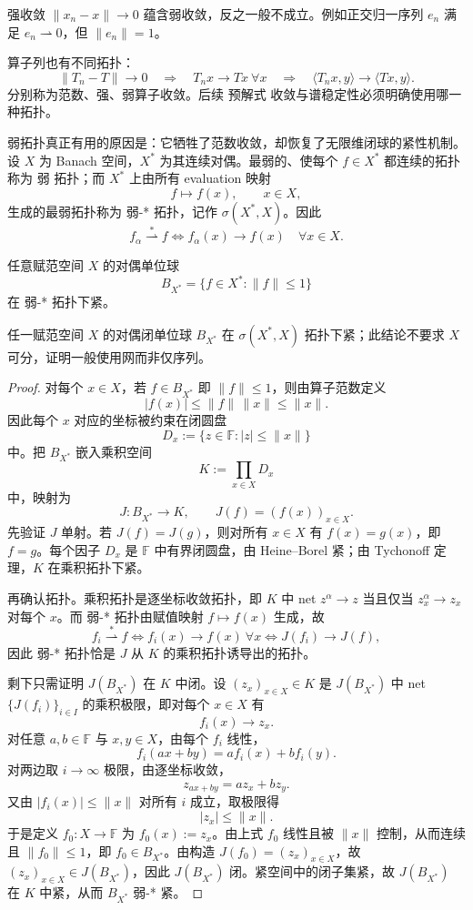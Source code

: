 强收敛 $\|x_n-x\|\to0$ 蕴含弱收敛，反之一般不成立。例如正交归一序列 $e_n$ 满足 $e_n\rightharpoonup0$，但 $\|e_n\|=1$。

算子列也有不同拓扑：
\[
\|T_n-T\|\to0
\quad\Longrightarrow\quad
T_nx\to Tx\ \forall x
\quad\Longrightarrow\quad
\langle T_nx,y\rangle\to\langle Tx,y\rangle.
\]
分别称为范数、强、弱算子收敛。后续 预解式 收敛与谱稳定性必须明确使用哪一种拓扑。

弱拓扑真正有用的原因是：它牺牲了范数收敛，却恢复了无限维闭球的紧性机制。设 $X$ 为 Banach 空间，$X^*$ 为其连续对偶。最弱的、使每个 $f\in X^*$ 都连续的拓扑称为 弱 拓扑；而 $X^*$ 上由所有 evaluation 映射
\[
f\longmapsto f(x),
\qquad x\in X,
\]
生成的最弱拓扑称为 弱-* 拓扑，记作 $\sigma(X^*,X)$。因此
\[
f_\alpha\overset{*}{\rightharpoonup}f
\iff
f_\alpha(x)\to f(x)
\quad\forall x\in X.
\]

\begin{theorem}
任意赋范空间 $X$ 的对偶单位球
\[
B_{X^*}=\{f\in X^*:\|f\|\le1\}
\]
在 弱-* 拓扑下紧。
\end{theorem}

\begin{theorem}[对偶单位球的弱星紧性]
任一赋范空间 $X$ 的对偶闭单位球 $B_{X^*}$ 在 $\sigma(X^*,X)$ 拓扑下紧；此结论不要求 $X$ 可分，证明一般使用网而非仅序列。
\end{theorem}
\begin{proof}
对每个 $x\in X$，若 $f\in B_{X^*}$ 即 $\|f\|\le1$，则由算子范数定义
\[
|f(x)|\le\|f\|\,\|x\|\le\|x\|.
\]
因此每个 $x$ 对应的坐标被约束在闭圆盘
\[
D_x:=\{z\in\mathbb F:|z|\le\|x\|\}
\]
中。把 $B_{X^*}$ 嵌入乘积空间
\[
K:=\prod_{x\in X}D_x
\]
中，映射为
\[
J:B_{X^*}\to K,
\qquad
J(f)=(f(x))_{x\in X}.
\]
先验证 $J$ 单射。若 $J(f)=J(g)$，则对所有 $x\in X$ 有 $f(x)=g(x)$，即 $f=g$。每个因子 $D_x$ 是 $\mathbb F$ 中有界闭圆盘，由 Heine--Borel 紧；由 Tychonoff 定理，$K$ 在乘积拓扑下紧。

再确认拓扑。乘积拓扑是逐坐标收敛拓扑，即 $K$ 中 net $z^\alpha\to z$ 当且仅当 $z_x^\alpha\to z_x$ 对每个 $x$。而 弱-* 拓扑由赋值映射 $f\mapsto f(x)$ 生成，故
\[
f_i\overset{*}{\rightharpoonup}f
\iff
f_i(x)\to f(x)\ \forall x
\iff
J(f_i)\to J(f),
\]
因此 弱-* 拓扑恰是 $J$ 从 $K$ 的乘积拓扑诱导出的拓扑。

剩下只需证明 $J(B_{X^*})$ 在 $K$ 中闭。设 $(z_x)_{x\in X}\in K$ 是 $J(B_{X^*})$ 中 net $\{J(f_i)\}_{i\in I}$ 的乘积极限，即对每个 $x\in X$ 有
\[
f_i(x)\to z_x.
\]
对任意 $a,b\in\mathbb F$ 与 $x,y\in X$，由每个 $f_i$ 线性，
\[
f_i(ax+by)=af_i(x)+bf_i(y).
\]
对两边取 $i\to\infty$ 极限，由逐坐标收敛，
\[
z_{ax+by}=az_x+bz_y.
\]
又由 $|f_i(x)|\le\|x\|$ 对所有 $i$ 成立，取极限得
\[
|z_x|\le\|x\|.
\]
于是定义 $f_0:X\to\mathbb F$ 为 $f_0(x):=z_x$。由上式 $f_0$ 线性且被 $\|x\|$ 控制，从而连续且 $\|f_0\|\le1$，即 $f_0\in B_{X^*}$。由构造 $J(f_0)=(z_x)_{x\in X}$，故 $(z_x)_{x\in X}\in J(B_{X^*})$，因此 $J(B_{X^*})$ 闭。紧空间中的闭子集紧，故 $J(B_{X^*})$ 在 $K$ 中紧，从而 $B_{X^*}$ 弱-* 紧。
\end{proof}


